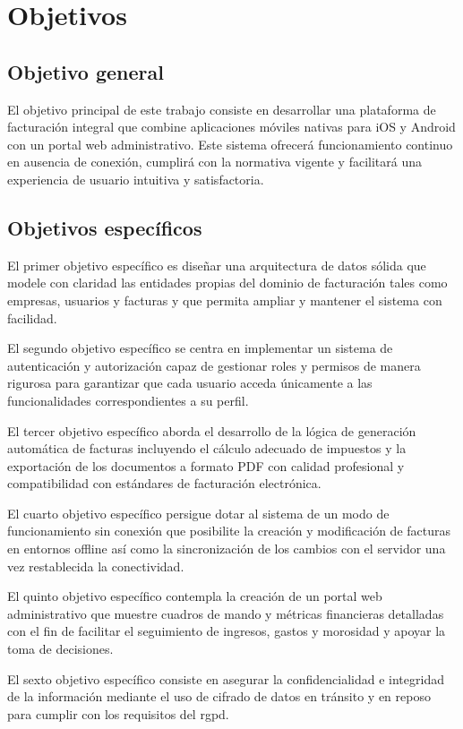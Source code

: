\section{Objetivos}
\begin{large}

\subsection{Objetivo general}
El objetivo principal de este trabajo consiste en desarrollar una plataforma de facturación integral que combine aplicaciones móviles nativas para iOS y Android con un portal web administrativo. Este sistema ofrecerá funcionamiento continuo en ausencia de conexión, cumplirá con la normativa vigente y facilitará una experiencia de usuario intuitiva y satisfactoria.

\subsection{Objetivos específicos}
El primer objetivo específico es diseñar una arquitectura de datos sólida que modele con claridad las entidades propias del dominio de facturación tales como empresas, usuarios y facturas y que permita ampliar y mantener el sistema con facilidad.

El segundo objetivo específico se centra en implementar un sistema de autenticación y autorización capaz de gestionar roles y permisos de manera rigurosa para garantizar que cada usuario acceda únicamente a las funcionalidades correspondientes a su perfil.

El tercer objetivo específico aborda el desarrollo de la lógica de generación automática de facturas incluyendo el cálculo adecuado de impuestos y la exportación de los documentos a formato PDF con calidad profesional y compatibilidad con estándares de facturación electrónica.

El cuarto objetivo específico persigue dotar al sistema de un modo de funcionamiento sin conexión que posibilite la creación y modificación de facturas en entornos offline así como la sincronización de los cambios con el servidor una vez restablecida la conectividad.

El quinto objetivo específico contempla la creación de un portal web administrativo que muestre cuadros de mando y métricas financieras detalladas con el fin de facilitar el seguimiento de ingresos, gastos y morosidad y apoyar la toma de decisiones.

El sexto objetivo específico consiste en asegurar la confidencialidad e integridad de la información mediante el uso de cifrado de datos en tránsito y en reposo para cumplir con los requisitos del \gls{rgpd}.
\end{large}

